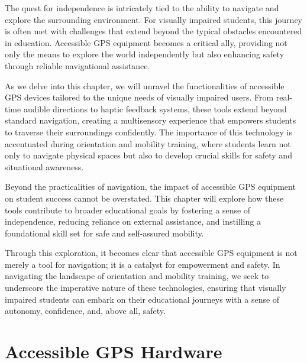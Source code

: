 \documentclass[14pt,letterpaper,twoside]{extreport}
\begin{document}
The quest for independence is intricately tied to the ability to navigate and explore the surrounding environment. For visually impaired students, this journey is often met with challenges that extend beyond the typical obstacles encountered in education. Accessible GPS equipment becomes a critical ally, providing not only the means to explore the world independently but also enhancing safety through reliable navigational assistance.

As we delve into this chapter, we will unravel the functionalities of accessible GPS devices tailored to the unique needs of visually impaired users. From real-time audible directions to haptic feedback systems, these tools extend beyond standard navigation, creating a multisensory experience that empowers students to traverse their surroundings confidently. The importance of this technology is accentuated during orientation and mobility training, where students learn not only to navigate physical spaces but also to develop crucial skills for safety and situational awareness.

Beyond the practicalities of navigation, the impact of accessible GPS equipment on student success cannot be overstated. This chapter will explore how these tools contribute to broader educational goals by fostering a sense of independence, reducing reliance on external assistance, and instilling a foundational skill set for safe and self-assured mobility.

Through this exploration, it becomes clear that accessible GPS equipment is not merely a tool for navigation; it is a catalyst for empowerment and safety. In navigating the landscape of orientation and mobility training, we seek to underscore the imperative nature of these technologies, ensuring that visually impaired students can embark on their educational journeys with a sense of autonomy, confidence, and, above all, safety.

\hypertarget{accessible-gps-mapping-hardware}{%
	\section{Accessible GPS Hardware}\label{accessible-gps-mapping-hardware}}
\end{document}
